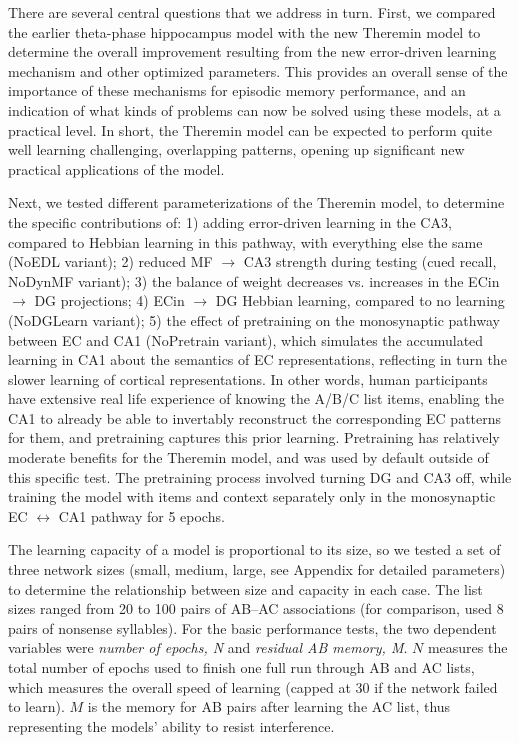 \documentclass[10pt,letterpaper]{article}
\begin{document}
There are several central questions that we address in turn.  First, we compared the earlier theta-phase hippocampus model with the new Theremin model to determine the overall improvement resulting from the new error-driven learning mechanism and other optimized parameters.  This provides an overall sense of the importance of these mechanisms for episodic memory performance, and an indication of what kinds of problems can now be solved using these models, at a practical level.  In short, the Theremin model can be expected to perform quite well learning challenging, overlapping patterns, opening up significant new practical applications of the model.

Next, we tested different parameterizations of the Theremin model, to determine the specific contributions of: 1) adding error-driven learning in the CA3, compared to Hebbian learning in this pathway, with everything else the same (NoEDL variant); 2) reduced MF $\rightarrow$ CA3 strength during testing (cued recall, NoDynMF variant); 3) the balance of weight decreases vs. increases in the ECin $\rightarrow$ DG projections; 4) ECin $\rightarrow$ DG Hebbian learning, compared to no learning (NoDGLearn variant); 5) the effect of pretraining on the monosynaptic pathway between EC and CA1 (NoPretrain variant), which simulates the accumulated learning in CA1 about the semantics of EC representations, reflecting in turn the slower learning of cortical representations. In other words, human participants have extensive real life experience of knowing the A/B/C list items, enabling the CA1 to already be able to invertably reconstruct the corresponding EC patterns for them, and pretraining captures this prior learning.  Pretraining has relatively moderate benefits for the Theremin model, and was used by default outside of this specific test.  The pretraining process involved turning DG and CA3 off, while training the model with items and context separately only in the monosynaptic EC $\leftrightarrow$ CA1 pathway for 5 epochs. 

The learning capacity of a model is proportional to its size, so we tested a set of three network sizes (small, medium, large, see Appendix for detailed parameters) to determine the relationship between size and capacity in each case.  The list sizes ranged from 20 to 100 pairs of AB--AC associations (for comparison, \cite{BarnesUnderwood59} used 8 pairs of nonsense syllables).  For the basic performance tests, the two dependent variables were \emph{number of epochs, N} and \emph{residual AB memory, M}.  $N$ measures the total number of epochs used to finish one full run through AB and AC lists, which measures the overall speed of learning (capped at 30 if the network failed to learn). $M$ is the memory for AB pairs after learning the AC list, thus representing the models' ability to resist interference.
\end{document}
